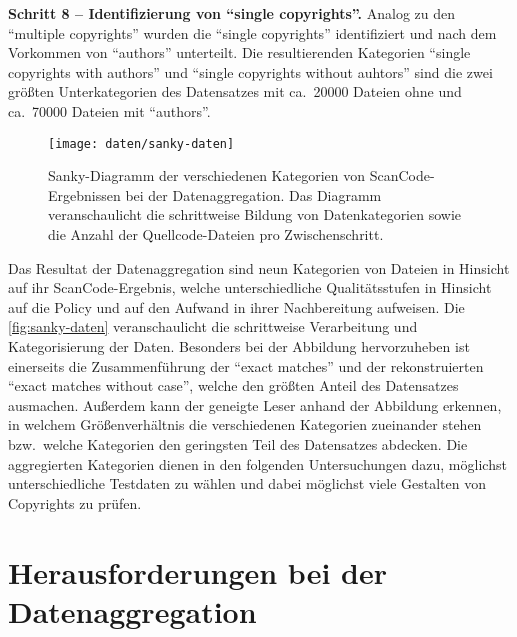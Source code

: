 \textbf{Schritt 8 -- Identifizierung von \enquote{single copyrights}.}
Analog zu den \enquote{multiple copyrights} wurden die \enquote{single copyrights} identifiziert und nach dem Vorkommen von \enquote{authors} unterteilt.
Die resultierenden Kategorien \enquote{single copyrights with authors} und \enquote{single copyrights without auhtors} sind die zwei größten Unterkategorien des Datensatzes mit ca.\ \num{20000} Dateien ohne und ca.\ \num{70000} Dateien mit \enquote{authors}.

\begin{figure}[ht]
    \centering
    \texttt{[image: daten/sanky-daten]}
    \caption{Sanky-Diagramm der verschiedenen Kategorien von ScanCode-Ergebnissen bei der Datenaggregation. Das Diagramm veranschaulicht die schrittweise Bildung von Datenkategorien sowie die Anzahl der Quellcode-Dateien pro Zwischenschritt.}
    \label{fig:sanky-daten}
\end{figure}
Das Resultat der Datenaggregation sind neun Kategorien von Dateien in Hinsicht auf ihr ScanCode-Ergebnis, welche unterschiedliche Qualitätsstufen in Hinsicht auf die Policy und auf den Aufwand in ihrer Nachbereitung aufweisen.
Die \autoref{fig:sanky-daten} veranschaulicht die schrittweise Verarbeitung und Kategorisierung der Daten.
Besonders bei der Abbildung hervorzuheben ist einerseits die Zusammenführung der \enquote{exact matches} und der rekonstruierten \enquote{exact matches without case}, welche den größten Anteil des Datensatzes ausmachen.
Außerdem kann der geneigte Leser anhand der Abbildung erkennen, in welchem Größenverhältnis die verschiedenen Kategorien zueinander stehen bzw.\ welche Kategorien den geringsten Teil des Datensatzes abdecken.
Die aggregierten Kategorien dienen in den folgenden Untersuchungen dazu, möglichst unterschiedliche Testdaten zu wählen und dabei möglichst viele Gestalten von Copyrights zu prüfen.


\section{Herausforderungen bei der Datenaggregation}\label{sec:herausforderungen-datenaggregation}

